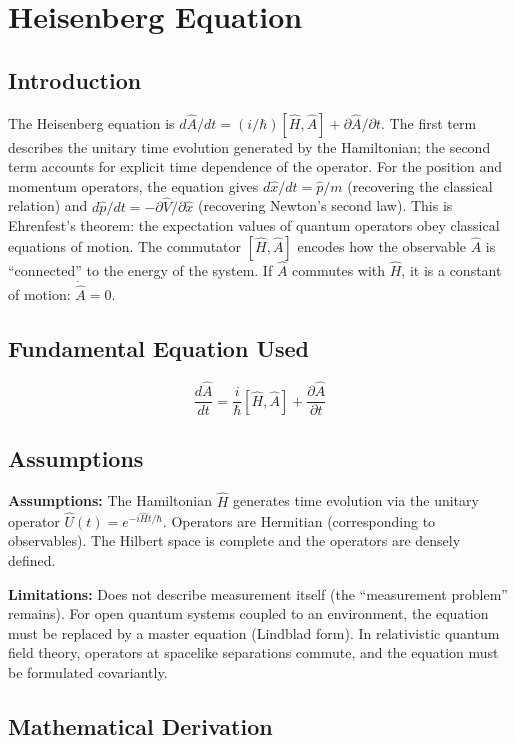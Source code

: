 \documentclass[11pt,openright]{book}
\begin{document}

\chapter{Heisenberg Equation}

\section*{Introduction}

The Heisenberg equation is $d\hat{A}/dt = (i/\hbar)[\hat{H}, \hat{A}] + \partial\hat{A}/\partial t$. The first term describes the unitary time evolution generated by the Hamiltonian; the second term accounts for explicit time dependence of the operator. For the position and momentum operators, the equation gives $d\hat{x}/dt = \hat{p}/m$ (recovering the classical relation) and $d\hat{p}/dt = -\partial\hat{V}/\partial\hat{x}$ (recovering Newton's second law). This is Ehrenfest's theorem: the expectation values of quantum operators obey classical equations of motion. The commutator $[\hat{H}, \hat{A}]$ encodes how the observable $\hat{A}$ is ``connected'' to the energy of the system. If $\hat{A}$ commutes with $\hat{H}$, it is a constant of motion: $\dot{\hat{A}} = 0$.
\section*{Fundamental Equation Used}

\[
\frac{d\hat{A}}{dt}=\frac{i}{\hbar}[\hat{H},\hat{A}]+\frac{\partial\hat{A}}{\partial t}
\]
\section*{Assumptions}

\textbf{Assumptions:} The Hamiltonian $\hat{H}$ generates time evolution via the unitary operator $\hat{U}(t) = e^{-i\hat{H}t/\hbar}$. Operators are Hermitian (corresponding to observables). The Hilbert space is complete and the operators are densely defined.


\textbf{Limitations:} Does not describe measurement itself (the ``measurement problem'' remains). For open quantum systems coupled to an environment, the equation must be replaced by a master equation (Lindblad form). In relativistic quantum field theory, operators at spacelike separations commute, and the equation must be formulated covariantly.


\section*{Mathematical Derivation}
\end{document}
